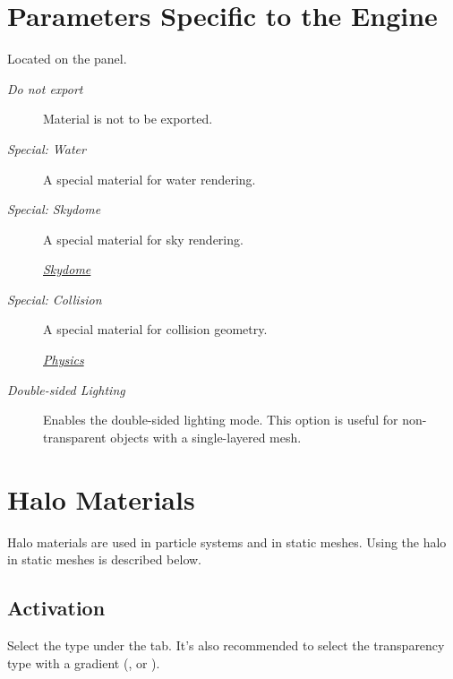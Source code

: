 \documentclass[a4paper,12pt,oneside]{sphinxmanual}
\begin{document}

\section{Parameters Specific to the Engine}
\label{materials:id13}\label{materials:index-9}
Located on the  panel.
\begin{description}
\item[{\emph{Do not export}}] \leavevmode
Material is not to be exported.

\item[{\emph{Special: Water}}] \leavevmode
A special material for water rendering.

\item[{\emph{Special: Skydome}}] \leavevmode
A special material for sky rendering.




{\hyperref[textures:skydome-texture]{\emph{Skydome}}}



\item[{\emph{Special: Collision}}] \leavevmode
A special material for collision geometry.




{\hyperref[physics:physics]{\emph{Physics}}}



\item[{\emph{Double-sided Lighting}}] \leavevmode
Enables the double-sided lighting mode. This option is useful for non-transparent objects with a single-layered mesh.

\end{description}


\section{Halo Materials}
\label{materials:material-halo}\label{materials:index-10}\label{materials:halo}
Halo materials are used in particle systems and in static meshes. Using the halo in static meshes is described below.


\subsection{Activation}
\label{materials:id14}
Select the  type under the  tab. It's also recommended to select the transparency type with a gradient (,  or ).
\end{document}
